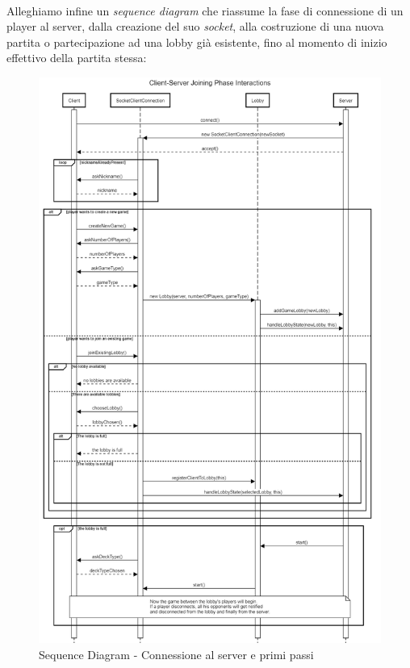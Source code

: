 \documentclass[a4paper, 12pt]{article}
\begin{document}
	\paragraph{}
	Alleghiamo infine un \textit{sequence diagram} che riassume la fase di connessione di un player al server, dalla creazione del suo \textit{socket}, alla costruzione di una nuova partita o partecipazione ad una lobby già esistente, fino al momento di inizio effettivo della partita stessa:\\
	\begin{figure}[h!]
		\centering
		\includegraphics[scale=0.33]{SequenceDiagramJoiningPhaseInteractions.png}
		\caption{Sequence Diagram - Connessione al server e primi passi}
	\end{figure}
	\newpage
\end{document}
